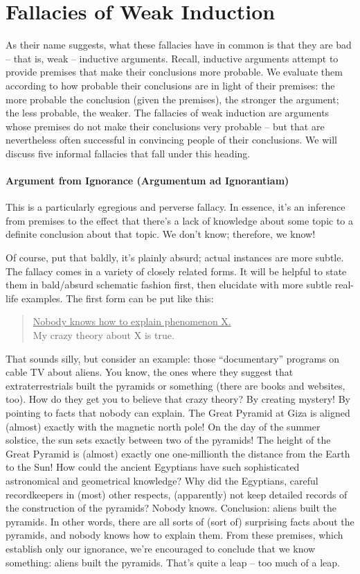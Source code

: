 
\chapter{Fallacies of Weak Induction}
As their name suggests, what these fallacies have in common is that they are bad -- that is, weak --
inductive arguments. Recall, inductive arguments attempt to provide premises that make their
conclusions more probable. We evaluate them according to how probable their conclusions are in
light of their premises: the more probable the conclusion (given the premises), the stronger the
argument; the less probable, the weaker. The fallacies of weak induction are arguments whose
premises do not make their conclusions very probable -- but that are nevertheless often successful
in convincing people of their conclusions. We will discuss five informal fallacies that fall under
this heading.

\subsubsection{Argument from Ignorance (Argumentum ad Ignorantiam)}
This is a particularly egregious and perverse fallacy. In essence, it's an inference from premises to
the effect that there's a lack of knowledge about some topic to a definite conclusion about that
topic. We don't know; therefore, we know!

Of course, put that baldly, it's plainly absurd; actual instances are more subtle. The fallacy comes
in a variety of closely related forms. It will be helpful to state them in bald/absurd schematic
fashion first, then elucidate with more subtle real-life examples.
The first form can be put like this:

\begin{quote}
\underline{Nobody knows how to explain phenomenon X.} \\
My crazy theory about X is true.\end{quote}

That sounds silly, but consider an example: those ``documentary'' programs on cable TV about
aliens. You know, the ones where they suggest that extraterrestrials built the pyramids or
something (there are books and websites, too). How do they get you to believe that crazy theory?
By creating mystery! By pointing to facts that nobody can explain. The Great Pyramid at Giza is
aligned (almost) exactly with the magnetic north pole! On the day of the summer solstice, the sun
sets exactly between two of the pyramids! The height of the Great Pyramid is (almost) exactly one
one-millionth the distance from the Earth to the Sun! How could the ancient Egyptians have such
sophisticated astronomical and geometrical knowledge? Why did the Egyptians, careful 
recordkeepers in (most) other respects, (apparently) not keep detailed records of the construction of the
pyramids? Nobody knows. Conclusion: aliens built the pyramids.
In other words, there are all sorts of (sort of) surprising facts about the pyramids, and nobody
knows how to explain them. From these premises, which establish only our ignorance, we're
encouraged to conclude that we know something: aliens built the pyramids. That's quite a leap --
too much of a leap.

